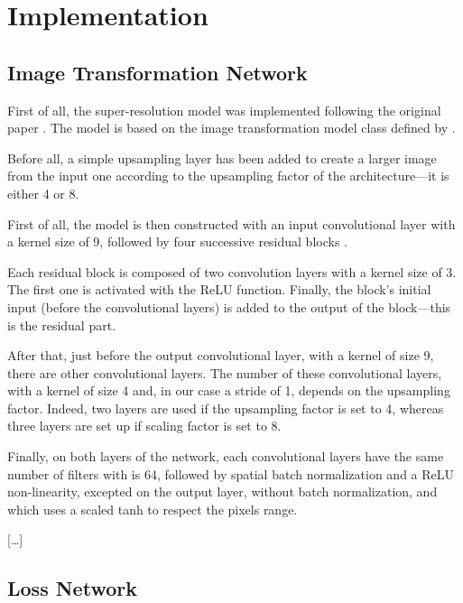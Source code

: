 \documentclass{article}
\begin{document}
{
    \section{Implementation}
    \label{sec:implementation}

    \subsection{Image Transformation Network}
    \label{subsec:image-transformation-network-implementation}

    First of all, the super-resolution model was implemented following the original paper \citep{sr}. The model is based on the image transformation model class defined by \cite{image-transform-network}.

    \bigskip

    Before all, a simple upsampling layer has been added to create a larger image from the input one according to the upsampling factor of the architecture—it is either 4 or 8.

    First of all, the model is then constructed with an input convolutional layer with a kernel size of 9, followed by four successive residual blocks \citep{residual}.
  

    Each residual block is composed of two convolution layers with a kernel size of 3. The first one is activated with the ReLU function. Finally, the block's initial input (before the convolutional layers) is added to the output of the block---this is the residual part.

    After that, just before the output convolutional layer, with a kernel of size 9, there are other convolutional layers. The number of these convolutional layers, with a kernel of size 4 and, in our case a stride of 1, depends on the upsampling factor. Indeed,  two layers are used if the upsampling factor is set to 4, whereas three layers are set up if scaling factor is set to 8.

    Finally, on both layers of the network, each convolutional layers have the same number of filters with is 64, followed by spatial batch normalization and a ReLU non-linearity, excepted on the output layer, without batch normalization, and which uses a scaled tanh to respect the pixels range.

    \bigskip

    […]

    \subsection{Loss Network}
    \label{subsec:loss-network-implementation}

}
\end{document}
